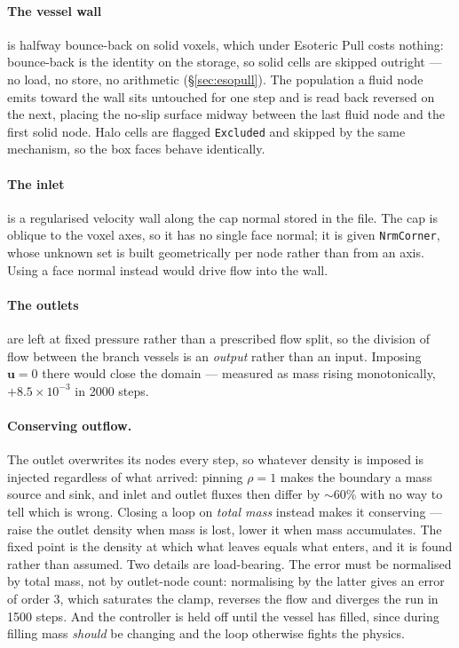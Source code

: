 \documentclass[11pt,a4paper]{article}
\newcommand{\code}[1]{\texttt{\small #1}}
\newcommand{\uu}{\bm{u}}
\newcommand{\e}[1]{\times 10^{#1}}
\begin{document}
\paragraph{The vessel wall} is halfway bounce-back on solid voxels, which under
Esoteric Pull costs nothing: bounce-back is the identity on the storage, so solid
cells are skipped outright --- no load, no store, no arithmetic
(\S\ref{sec:esopull}). The population a fluid node emits toward the wall sits
untouched for one step and is read back reversed on the next, placing the no-slip
surface midway between the last fluid node and the first solid node. Halo cells
are flagged \code{Excluded} and skipped by the same mechanism, so the box faces
behave identically.

\paragraph{The inlet} is a regularised velocity wall along the cap normal stored
in the file. The cap is oblique to the voxel axes, so it has no single face
normal; it is given \code{NrmCorner}, whose unknown set is built geometrically
per node rather than from an axis. Using a face normal instead would drive flow
into the wall.

\paragraph{The outlets} are left at fixed pressure rather than a prescribed flow
split, so the division of flow between the branch vessels is an \emph{output}
rather than an input. Imposing $\uu=0$ there would close the domain --- measured
as mass rising monotonically, $+8.5\e{-3}$ in 2000 steps.

\paragraph{Conserving outflow.} The outlet overwrites its nodes every step, so
whatever density is imposed is injected regardless of what arrived: pinning
$\rho=1$ makes the boundary a mass source and sink, and inlet and outlet fluxes
then differ by ${\sim}60\%$ with no way to tell which is wrong. Closing a loop on
\emph{total mass} instead makes it conserving --- raise the outlet density when
mass is lost, lower it when mass accumulates. The fixed point is the density at
which what leaves equals what enters, and it is found rather than assumed. Two
details are load-bearing. The error must be normalised by total mass, not by
outlet-node count: normalising by the latter gives an error of order $3$, which
saturates the clamp, reverses the flow and diverges the run in 1500 steps. And
the controller is held off until the vessel has filled, since during filling mass
\emph{should} be changing and the loop otherwise fights the physics.
\end{document}
